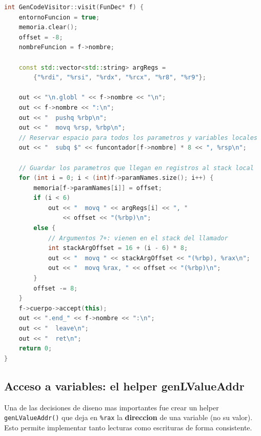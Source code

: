 \documentclass[12pt, a4paper]{article}
\begin{document}
\begin{lstlisting}[language=C++, style=cppstyle, caption={Generacion de codigo para FunDec}]
int GenCodeVisitor::visit(FunDec* f) {
    entornoFuncion = true;
    memoria.clear();
    offset = -8;
    nombreFuncion = f->nombre;

    const std::vector<std::string> argRegs =
        {"%rdi", "%rsi", "%rdx", "%rcx", "%r8", "%r9"};

    out << "\n.globl " << f->nombre << "\n";
    out << f->nombre << ":\n";
    out << "  pushq %rbp\n";
    out << "  movq %rsp, %rbp\n";
    // Reservar espacio para todos los parametros y variables locales
    out << "  subq $" << funcontador[f->nombre] * 8 << ", %rsp\n";

    // Guardar los parametros que llegan en registros al stack local
    for (int i = 0; i < (int)f->paramNames.size(); i++) {
        memoria[f->paramNames[i]] = offset;
        if (i < 6)
            out << "  movq " << argRegs[i] << ", "
                << offset << "(%rbp)\n";
        else {
            // Argumentos 7+: vienen en el stack del llamador
            int stackArgOffset = 16 + (i - 6) * 8;
            out << "  movq " << stackArgOffset << "(%rbp), %rax\n";
            out << "  movq %rax, " << offset << "(%rbp)\n";
        }
        offset -= 8;
    }
    f->cuerpo->accept(this);
    out << ".end_" << f->nombre << ":\n";
    out << "  leave\n";
    out << "  ret\n";
    return 0;
}
\end{lstlisting}

\subsection{Acceso a variables: el helper genLValueAddr}

Una de las decisiones de diseno mas importantes fue crear un helper \texttt{genLValueAddr()} que deja en \texttt{\%rax} la \textbf{direccion} de una variable (no su valor). Esto permite implementar tanto lecturas como escrituras de forma consistente.
\end{document}

